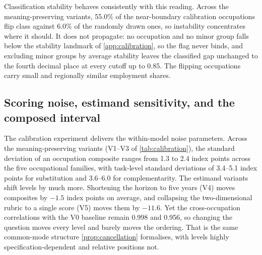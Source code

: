 Classification stability behaves consistently with this reading. Across the meaning-preserving variants, 55.0\% of the near-boundary calibration occupations flip class against 6.0\% of the randomly drawn ones, so instability concentrates where it should. It does not propagate: no occupation and no minor group falls below the stability landmark of \cref{app:calibration}, so the flag never binds, and excluding minor groups by average stability leaves the classified gap unchanged to the fourth decimal place at every cutoff up to 0.85. The flipping occupations carry small and regionally similar employment shares.
 
\subsection{Scoring noise, estimand sensitivity, and the composed interval}\label{sec:interval}
 
The calibration experiment delivers the within-model noise parameters. Across the meaning-preserving variants (V1--V3 of \cref{tab:calibration}), the standard deviation of an occupation composite ranges from 1.3 to 2.4 index points across the five occupational families, with task-level standard deviations of 3.4--5.1 index points for substitution and 3.6--6.0 for complementarity. The estimand variants shift levels by much more. Shortening the horizon to five years (V4) moves composites by $-1.5$ index points on average, and collapsing the two-dimensional rubric to a single score (V5) moves them by $-11.6$. Yet the cross-occupation correlations with the V0 baseline remain 0.998 and 0.956, so changing the question moves every level and barely moves the ordering. That is the same common-mode structure \cref{prop:cancellation} formalises, with levels highly specification-dependent and relative positions not. 
 
